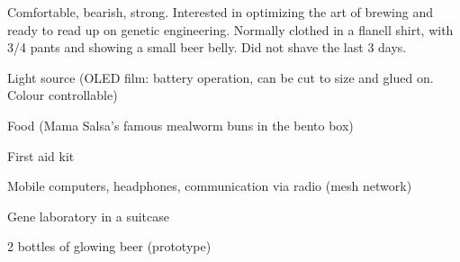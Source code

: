 \newpage
\begin{npcBox}[title=The Barrel continued]
    \begin{npcDescription}
    Comfortable, bearish, strong. Interested in optimizing the art of brewing and ready to read up on genetic engineering. Normally clothed in a flanell shirt, with 3/4 pants and showing a small beer belly. Did not shave the last 3 days.
    \end{npcDescription}


    \begin{equipment}
    \item Light source (OLED film: battery operation, can be cut to size and glued on. Colour controllable)
    \item Food (Mama Salsa's famous mealworm buns in the bento box)
    \item First aid kit
    \item Mobile computers, headphones, communication via radio (mesh network)
    \item Gene laboratory in a suitcase
    \item 2 bottles of glowing beer (prototype)
    \end{equipment}
\end{npcBox}



